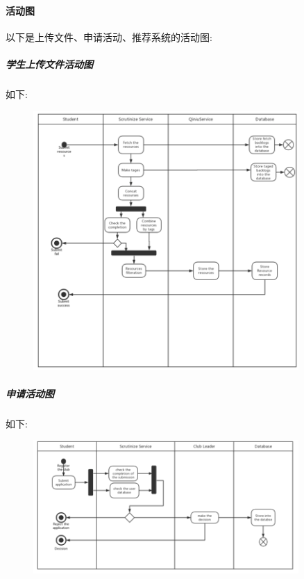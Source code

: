 \documentclass[UTF8]{ctexart}
\begin{document}
\paragraph{活动图}
以下是上传文件、申请活动、推荐系统的活动图:
\subparagraph*{学生上传文件活动图}
如下:\\
\begin{figure}[H]
\centering
\includegraphics[width = 0.9\textwidth]{upload-ac.png}
\end{figure}

\subparagraph*{申请活动图}
如下:\\
\begin{figure}[H]
\centering
\includegraphics[width = 0.9\textwidth]{apply-ac.png}
\end{figure}
\end{document}
